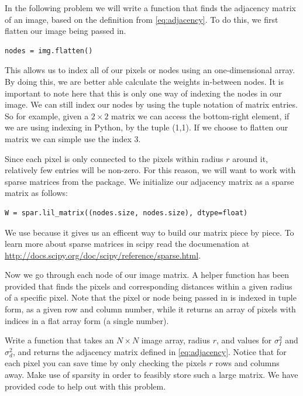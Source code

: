 In the following problem we will write a function that finds the adjacency matrix of an image, based on the definition from \eqref{eq:adjacency}. To do this, we first flatten our image being passed in. 

\begin{lstlisting}
nodes = img.flatten()
\end{lstlisting}

This allows us to index all of our pixels or nodes using an one-dimensional array. By doing this, we are better able calculate the weights in-between nodes. It is important to note here that this is only one way of indexing the nodes in our image. We can still index our nodes by using the tuple notation of matrix entries. So for example, given a $2 \times 2$ matrix we can access the bottom-right element, if we are using indexing in Python, by the tuple (1,1). If we choose to flatten our matrix we can simple use the index 3.

Since each pixel is only connected to the pixels within radius $r$ around it, relatively few entries will be non-zero. For this reason, we will want to work with sparse matrices from the  package. We initialize our adjacency matrix as a sparse matrix as follows:

\begin{lstlisting}
W = spar.lil_matrix((nodes.size, nodes.size), dtype=float)
\end{lstlisting}

We use  because it gives us an efficent way to build our matrix piece by piece. To learn more about sparse matrices in scipy read the documenation at \url{http://docs.scipy.org/doc/scipy/reference/sparse.html}.

Now we go through each node of our image matrix. A helper function has been provided that finds the pixels and corresponding distances within a given radius of a specific pixel. Note that the pixel or node being passed in is indexed in tuple form, as a given row and column number, while it returns an array of pixels with indices in a flat array form (a single number).


\begin{problem}
Write a function  that takes an $N \times N$ image array, radius $r$, and values for
$\sigma_I^2$ and $\sigma_d^2$, and returns the adjacency matrix defined in \eqref{eq:adjacency}.
Notice that for each pixel you can save time by only checking the pixels $r$ rows and columns away.
Make use of sparsity in order to feasibly store such a large matrix.
We have provided code to help out with this problem.
\end{problem}

